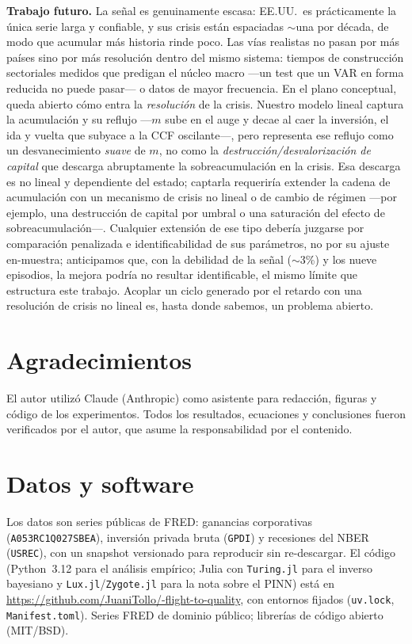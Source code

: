 \documentclass[11pt]{article}
\begin{document}
\textbf{Trabajo futuro.} La señal es genuinamente escasa: EE.UU.\ es prácticamente la única serie
larga y confiable, y sus crisis están espaciadas $\sim$una por década, de modo que acumular más
historia rinde poco. Las vías realistas no pasan por más países sino por más resolución dentro del
mismo sistema: tiempos de construcción sectoriales medidos que predigan el núcleo macro ---un test
que un VAR en forma reducida no puede pasar--- o datos de mayor frecuencia. En el plano conceptual,
queda abierto cómo entra la \emph{resolución} de la crisis. Nuestro modelo lineal captura la
acumulación y su reflujo ---$m$ sube en el auge y decae al caer la inversión, el ida y vuelta que
subyace a la CCF oscilante---, pero representa ese reflujo como un desvanecimiento \emph{suave} de
$m$, no como la \emph{destrucción/desvalorización de capital} que descarga abruptamente la
sobreacumulación en la crisis. Esa descarga es no lineal y dependiente del estado; captarla
requeriría extender la cadena de acumulación con un mecanismo de crisis no lineal o de cambio de
régimen ---por ejemplo, una destrucción de capital por umbral o una saturación del efecto de
sobreacumulación---. Cualquier extensión de ese tipo debería juzgarse por comparación penalizada e
identificabilidad de sus parámetros, no por su ajuste en-muestra; anticipamos que, con la debilidad
de la señal ($\sim$3\%) y los nueve episodios, la mejora podría no resultar identificable, el mismo
límite que estructura este trabajo. Acoplar un ciclo generado por el retardo con una resolución de
crisis no lineal es, hasta donde sabemos, un problema abierto.

\section*{Agradecimientos}
El autor utilizó Claude (Anthropic) como asistente para redacción, figuras y código de los
experimentos. Todos los resultados, ecuaciones y conclusiones fueron verificados por el autor,
que asume la responsabilidad por el contenido.

\section*{Datos y software}
Los datos son series públicas de FRED: ganancias corporativas (\texttt{A053RC1Q027SBEA}),
inversión privada bruta (\texttt{GPDI}) y recesiones del NBER (\texttt{USREC}), con un snapshot
versionado para reproducir sin re-descargar. El código (Python~3.12 para el análisis empírico;
Julia con \texttt{Turing.jl} para el inverso bayesiano y \texttt{Lux.jl}/\texttt{Zygote.jl} para
la nota sobre el PINN) está en \url{https://github.com/JuaniTollo/-flight-to-quality}, con entornos
fijados (\texttt{uv.lock}, \texttt{Manifest.toml}). Series FRED de dominio público; librerías de
código abierto (MIT/BSD).
\end{document}
